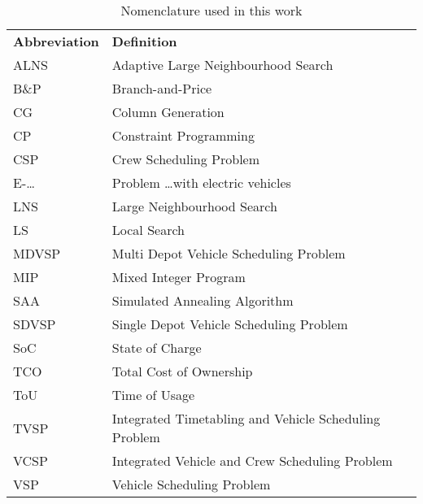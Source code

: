\documentclass[ht]{article}
\begin{document}
\begin{table}[h]
  \centering
  \begin{tabular}{ll}
    \toprule
    \multicolumn{1}{l}{\textbf{Abbreviation}} & \multicolumn{1}{l}{\textbf{Definition}}               \\
    \cmidrule(lr){1-1}\cmidrule(lr){2-2}
    ALNS                                      & Adaptive Large Neighbourhood Search                   \\
    B\&P                                      & Branch-and-Price                                      \\
    CG                                        & Column Generation                                     \\
    CP                                        & Constraint Programming                                \\
    CSP                                       & Crew Scheduling Problem                               \\
    E-\dots                                   & Problem \dots with electric vehicles                  \\
    LNS                                       & Large Neighbourhood Search                            \\
    LS                                        & Local Search                                          \\
    MDVSP                                     & Multi Depot Vehicle Scheduling Problem                \\
    MIP                                       & Mixed Integer Program                                 \\
    SAA                                       & Simulated Annealing Algorithm                         \\
    SDVSP                                     & Single Depot Vehicle Scheduling Problem               \\
    SoC                                       & State of Charge                                       \\
    TCO                                       & Total Cost of Ownership                               \\
    ToU                                       & Time of Usage                                         \\
    TVSP                                      & Integrated Timetabling and Vehicle Scheduling Problem \\
    VCSP                                      & Integrated Vehicle and Crew Scheduling Problem        \\
    VSP                                       & Vehicle Scheduling Problem                            \\
    \bottomrule
  \end{tabular}
  \caption{Nomenclature used in this work}
\end{table}
\end{document}
